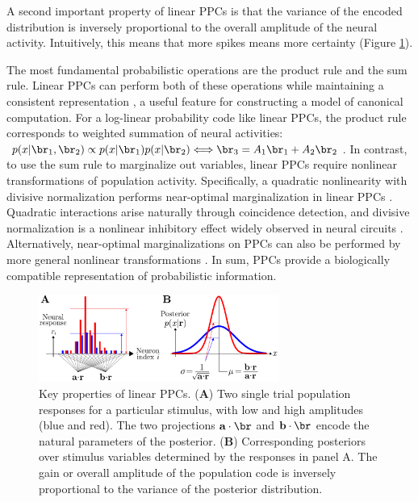 \documentclass{article}
\begin{document}
A second important property of linear PPCs is that the variance of the encoded distribution is inversely proportional to the overall amplitude of the neural activity. Intuitively, this means that more spikes means more certainty (Figure \ref{fig:PPCFig}).


The most fundamental probabilistic operations are the product rule and the sum rule. Linear PPCs can perform both of these operations while maintaining a consistent representation \cite{beck2011marginalization}, a useful feature for constructing a model of canonical computation. For a log-linear probability code like linear PPCs, the product rule corresponds to weighted summation of neural activities: $p(x|\br_1,\br_2)\propto p(x|\br_1)p(x|\br_2) \Longleftrightarrow \br_3=A_1\br_1+A_2\br_2$. In contrast, to use the sum rule to marginalize out variables, linear PPCs require nonlinear transformations of population activity. Specifically, a quadratic nonlinearity with divisive normalization performs near-optimal marginalization in linear PPCs \cite{beck2011marginalization}. Quadratic interactions arise naturally through coincidence detection, and divisive normalization is a nonlinear inhibitory effect widely observed in neural circuits \cite{heeger1992normalization,carandini2012normalization,rubin2015stabilized}. Alternatively, near-optimal marginalizations on PPCs can also be performed by more general nonlinear transformations \cite{vasudeva2015marginalization}. In sum, PPCs provide a biologically compatible representation of probabilistic information.

\begin{figure}[h]
	\centering
	\includegraphics[width=0.7\textwidth]{Figures/PPC3.pdf}
	\caption{Key properties of linear PPCs. ({\bf A}) Two single trial population responses for a particular stimulus, with low and high amplitudes (blue and red). The two projections $\textbf{a}\cdot\br$ and $\textbf{b}\cdot\br$ encode the natural parameters of the posterior. ({\bf B}) Corresponding posteriors over stimulus variables determined by the responses in panel A. The gain or overall amplitude of the population code is inversely proportional to the variance of the posterior distribution.}
	\label{fig:PPCFig}
\end{figure}
\end{document}

